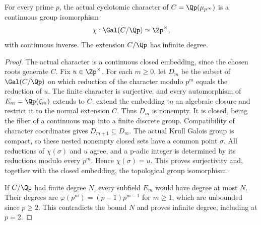 \begin{lemma}
\label{ft:infinite-cyclotomic-character}
\leanok
For every prime $p$, the actual cyclotomic character of
$C=\Qp(\mu_{p^\infty})$ is a continuous group isomorphism
\[
 \chi:\Gal(C/\Qp)\simeq\Zp^\times,
\]
with continuous inverse. The extension $C/\Qp$ has infinite degree.
\end{lemma}
\begin{proof}
The actual character is a continuous closed embedding, since the
chosen roots generate $C$. Fix $u\in\Zp^\times$. For each $m\geq0$,
let $D_m$ be the subset of $\Gal(C/\Qp)$ on which reduction of the
character modulo $p^m$ equals the reduction of $u$.
The finite character is surjective, and every automorphism of
$E_m=\Qp(\zeta_m)$ extends to $C$: extend the embedding to an
algebraic closure and restrict it to the normal extension $C$.
Thus $D_m$ is nonempty. It is closed, being the fiber of a continuous
map into a finite discrete group. Compatibility of character
coordinates gives $D_{m+1}\subseteq D_m$. The actual Krull Galois
group is compact, so these nested nonempty closed sets have a common
point $\sigma$. All reductions of $\chi(\sigma)$ and $u$ agree,
and a p-adic integer is determined by its reductions modulo every
$p^m$. Hence $\chi(\sigma)=u$. This proves surjectivity and,
together with the closed embedding, the topological group isomorphism.

If $C/\Qp$ had finite degree $N$, every subfield $E_m$ would have
degree at most $N$. Their degrees are $\varphi(p^m)=(p-1)p^{m-1}$
for $m\geq1$, which are unbounded since $p\geq2$. This contradicts
the bound $N$ and proves infinite degree, including at $p=2$.
\end{proof}

